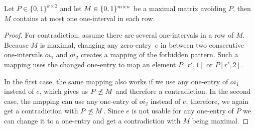 \begin{lemma}
\label{lemma:twocols}
Let $P\in\{0,1\}^{k\times2}$ and let $M\in\{0,1\}^{m\times n}$ be a maximal matrix avoiding $P$, then $M$ contains at most one one-interval in each row.
\end{lemma}
\begin{proof}
For contradiction, assume there are several one-intervals in a row of $M$. Because $M$ is maximal, changing any zero-entry~$e$ in between two consecutive one-intervals $oi_1$ and $oi_2$ creates a mapping of the forbidden pattern. Such a mapping uses the changed one-entry to map an element $P[r',1]$ or $P[r',2]$.

In the first case, the same mapping also works if we use any one-entry of $oi_1$ instead of $e$, which gives us $P\not\preceq M$ and therefore a contradiction. In the second case, the mapping can use any one-entry of $oi_2$ instead of $e$; therefore, we again get a contradiction with $P\not\preceq M$. Since $e$ is not usable for any one-entry of $P$ we can change it to a one-entry and get a contradiction with $M$ being maximal.
\end{proof}

